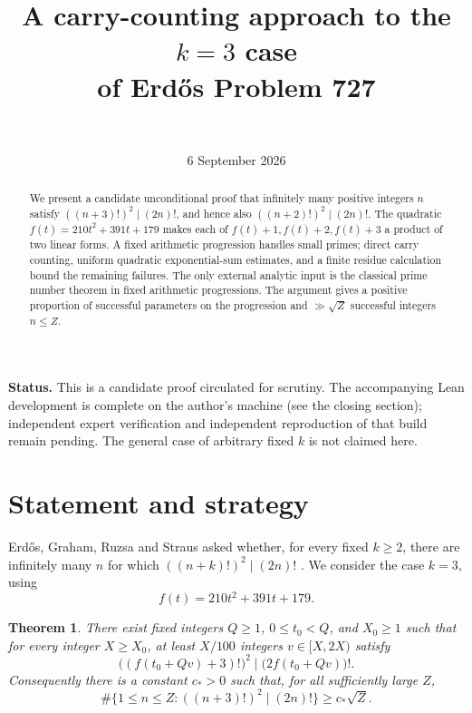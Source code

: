 \documentclass[11pt,a4paper]{article}
\title{\vspace{-1.3em}A carry-counting approach to the \(k=3\) case\\
of Erd\H{o}s Problem 727}
\author{\paperauthor\\[0.25em]\small\paperaffiliation}
\date{6 September 2026}
\newcommand{\1}{\mathbf 1}
\newtheorem{theorem}{Theorem}[section]
\numberwithin{equation}{section}
\begin{document}
\maketitle
\vspace{-1.2em}
\begin{abstract}
We present a candidate unconditional proof that infinitely many positive integers
\(n\) satisfy \(((n+3)!)^2\mid(2n)!\), and hence also \(((n+2)!)^2\mid(2n)!\).
The quadratic \(f(t)=210t^2+391t+179\) makes each of \(f(t)+1,f(t)+2,f(t)+3\)
a product of two linear forms. A fixed arithmetic progression handles small
primes; direct carry counting, uniform quadratic exponential-sum estimates,
and a finite residue calculation bound the remaining failures. The only
external analytic input is the classical prime number theorem in fixed
arithmetic progressions. The argument gives a positive proportion of successful
parameters on the progression and \(\gg\sqrt Z\) successful integers \(n\leq Z\).
\end{abstract}
\vspace{0.2em}
\noindent\textbf{Status.} This is a candidate proof circulated for scrutiny. The accompanying
Lean development is complete on the author's machine (see the closing section);
independent expert verification and independent reproduction of that build
remain pending. The general case of arbitrary fixed \(k\) is not
claimed here.

\section{Statement and strategy}

Erd\H{o}s, Graham, Ruzsa and Straus asked whether, for every fixed \(k\geq2\),
there are infinitely many \(n\) for which \(((n+k)!)^2\mid(2n)!\)
\cite[p.~90]{EGRS}. We consider the case \(k=3\), using
\[
 f(t)=210t^2+391t+179.
\]

\begin{theorem}\label{thm:main}
There exist fixed integers \(Q\geq1\), \(0\leq t_0<Q\), and \(X_0\geq1\)
such that for every integer \(X\geq X_0\), at least \(X/100\) integers
\(v\in[X,2X)\) satisfy
\begin{equation}\label{eq:target}
 \bigl((f(t_0+Qv)+3)!\bigr)^2\mid\bigl(2f(t_0+Qv)\bigr)!.
\end{equation}
Consequently there is a constant \(c_*>0\) such that, for all sufficiently
large \(Z\),
\[
 \#\{1\leq n\leq Z:((n+3)!)^2\mid(2n)!\}\geq c_*\sqrt Z.
\]
\end{theorem}
\end{document}

